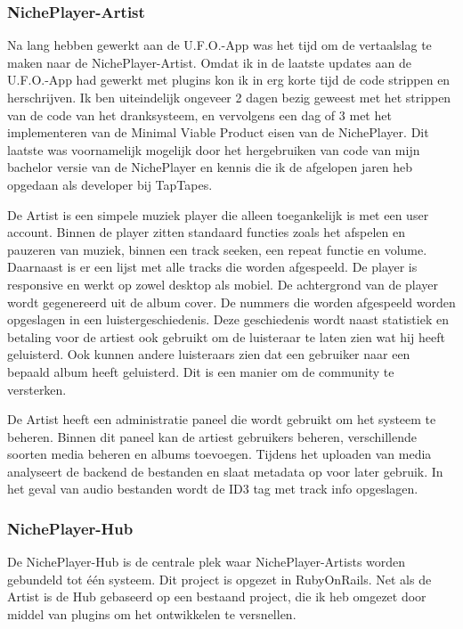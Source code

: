 \subsubsection*{NichePlayer-Artist}
Na lang hebben gewerkt aan de U.F.O.-App was het tijd om de vertaalslag te maken naar de NichePlayer-Artist. Omdat ik in de laatste updates aan de U.F.O.-App had gewerkt met plugins kon ik in erg korte tijd de code strippen en herschrijven. Ik ben uiteindelijk ongeveer 2 dagen bezig geweest met het strippen van de code van het dranksysteem, en vervolgens een dag of 3 met het implementeren van de Minimal Viable Product eisen van de NichePlayer. Dit laatste was voornamelijk mogelijk door het hergebruiken van code van mijn bachelor versie van de NichePlayer en kennis die ik de afgelopen jaren heb opgedaan als developer bij TapTapes.

De Artist is een simpele muziek player die alleen toegankelijk is met een user account. Binnen de player zitten standaard functies zoals het afspelen en pauzeren van muziek, binnen een track seeken, een repeat functie en volume. Daarnaast is er een lijst met alle tracks die worden afgespeeld. De player is responsive en werkt op zowel desktop als mobiel. De achtergrond van de player wordt gegenereerd uit de album cover. De nummers die worden afgespeeld worden opgeslagen in een luistergeschiedenis. Deze geschiedenis wordt naast statistiek en betaling voor de artiest ook gebruikt om de luisteraar te laten zien wat hij heeft geluisterd. Ook kunnen andere luisteraars zien dat een gebruiker naar een bepaald album heeft geluisterd. Dit is een manier om de community te versterken.

De Artist heeft een administratie paneel die wordt gebruikt om het systeem te beheren. Binnen dit paneel kan de artiest gebruikers beheren, verschillende soorten media beheren en albums toevoegen. Tijdens het uploaden van media analyseert de backend de bestanden en slaat metadata op voor later gebruik. In het geval van audio bestanden wordt de ID3 tag met track info opgeslagen.

\subsubsection*{NichePlayer-Hub}
De NichePlayer-Hub is de centrale plek waar NichePlayer-Artists worden gebundeld tot één systeem. Dit project is opgezet in RubyOnRails. Net als de Artist is de Hub gebaseerd op een bestaand project, die ik heb omgezet door middel van plugins om het ontwikkelen te versnellen.

